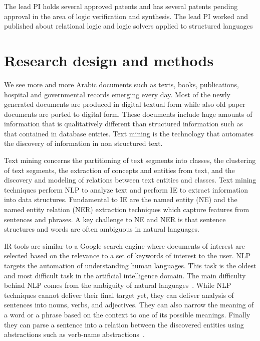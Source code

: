 \documentclass[12pt]{article}
\begin{document}
{The lead PI holds several approved patents and has several 
patents pending approval in the area of logic verification 
and synthesis.
The lead PI worked and published about relational logic and 
logic solvers applied to structured languages~\cite{seraICSE07,Zara05}

\section{Research design and methods}
\label{s:designmethods}

We see more and more Arabic documents such as texts,
books, publications, hospital and governmental records emerging 
every day.
Most of the newly generated documents are produced in digital 
textual form while also old paper documents are ported to digital 
form.
These documents include huge amounts of information that is 
qualitatively different than structured information such as that 
contained in database entries.
Text mining is the technology that automates the discovery of 
information in non structured text.

Text mining concerns the partitioning of text segments 
into classes,
the clustering of text segments,
the extraction of concepts and entities from text,
and the discovery and modeling of relations between text entities 
and classes.
Text mining techniques perform NLP to analyze text and perform 
IE to extract information into data structures.
Fundamental to IE are the named entity (NE) and the named entity 
relation (NER) extraction techniques which capture features from 
sentences and phrases.
A key challenge to NE and NER is that sentence structures and 
words are often ambiguous in natural languages.

IR tools are similar to a Google search 
engine where documents of interest are selected based on the 
relevance to a set of keywords of interest to the user.
NLP targets the automation of understanding human languages.
This task is the oldest and most difficult task in the artificial 
intelligence domain.
The main difficulty behind NLP comes from the ambiguity of 
natural languages~\cite{Osm08}.
While NLP techniques cannot deliver their final target yet, they 
can deliver analysis of sentences into nouns, verbs, 
and adjectives.
They can also narrow the meaning of a word or a phrase based on 
the context to one of its possible meanings.
Finally they can parse a sentence into a relation between the 
discovered entities using abstractions such as verb-name 
abstractions~\cite{Osm08}.

}
\end{document}
